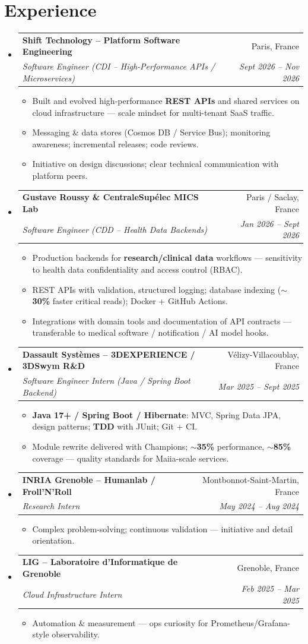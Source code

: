 \documentclass[letterpaper,10.5pt]{article}
\makeatletter
\newcommand{\resumeItem}[1]{\item\small{#1 \vspace{-1.5pt}}}
\newcommand{\resumeSubheading}[4]{\vspace{-1pt}\item\begin{tabular*}{0.97\textwidth}[t]{l@{\extracolsep{\fill}}r}\textbf{#1} & #2 \\\textit{\small#3} & \textit{\small #4} \\\end{tabular*}\vspace{-5pt}}
\newcommand{\resumeSubHeadingListStart}{\begin{itemize}[leftmargin=0.15in, label={}]}
\newcommand{\resumeSubHeadingListEnd}{\end{itemize}}
\newcommand{\resumeItemListStart}{\begin{itemize}[leftmargin=0.18in]}
\newcommand{\resumeItemListEnd}{\end{itemize}\vspace{-3pt}}
\makeatother
\begin{document}
\section{Experience}
\resumeSubHeadingListStart
  \resumeSubheading
    {Shift Technology -- Platform Software Engineering}{Paris, France}
    {Software Engineer (CDI -- High-Performance APIs / Microservices)}{Sept 2026 -- Nov 2026}
    \resumeItemListStart
      \resumeItem{Built and evolved high-performance \textbf{REST APIs} and shared services on cloud infrastructure --- scale mindset for multi-tenant SaaS traffic.}
      \resumeItem{Messaging \& data stores (Cosmos DB / Service Bus); monitoring awareness; incremental releases; code reviews.}
      \resumeItem{Initiative on design discussions; clear technical communication with platform peers.}
    \resumeItemListEnd
  \resumeSubheading
    {Gustave Roussy \& CentraleSup\'elec MICS Lab}{Paris / Saclay, France}
    {Software Engineer (CDD -- Health Data Backends)}{Jan 2026 -- Sept 2026}
    \resumeItemListStart
      \resumeItem{Production backends for \textbf{research/clinical data} workflows --- sensitivity to health data confidentiality and access control (RBAC).}
      \resumeItem{REST APIs with validation, structured logging; database indexing (\textbf{$\sim$30\%} faster critical reads); Docker + GitHub Actions.}
      \resumeItem{Integrations with domain tools and documentation of API contracts --- transferable to medical software / notification / AI model hooks.}
    \resumeItemListEnd
  \resumeSubheading
    {Dassault Syst\`emes -- 3DEXPERIENCE / 3DSwym R\&D}{V\'elizy-Villacoublay, France}
    {Software Engineer Intern (Java / Spring Boot Backend)}{Mar 2025 -- Sept 2025}
    \resumeItemListStart
      \resumeItem{\textbf{Java 17+ / Spring Boot / Hibernate}: MVC, Spring Data JPA, design patterns; \textbf{TDD} with JUnit; Git + CI.}
      \resumeItem{Module rewrite delivered with Champions; \textbf{$\sim$35\%} performance, \textbf{$\sim$85\%} coverage --- quality standards for Maiia-scale services.}
    \resumeItemListEnd
  \resumeSubheading
    {INRIA Grenoble -- Humanlab / Froll'N'Roll}{Montbonnot-Saint-Martin, France}
    {Research Intern}{May 2024 -- Aug 2024}
    \resumeItemListStart
      \resumeItem{Complex problem-solving; continuous validation --- initiative and detail orientation.}
    \resumeItemListEnd
  \resumeSubheading
    {LIG -- Laboratoire d'Informatique de Grenoble}{Grenoble, France}
    {Cloud Infrastructure Intern}{Feb 2025 -- Mar 2025}
    \resumeItemListStart
      \resumeItem{Automation \& measurement --- ops curiosity for Prometheus/Grafana-style observability.}
    \resumeItemListEnd
\resumeSubHeadingListEnd
\end{document}
